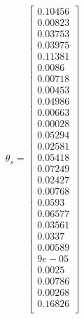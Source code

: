 \documentclass[a4paper]{article}
\theoremstyle{definition}
\newenvironment{soln}{
    \leavevmode\color{blue}\ignorespaces
}{}
\begin{document}
\begin{enumerate}
\begin{soln}
\begin{minipage}{0.5\textwidth}
\begin{gather*}
        \end{gather*}
    \end{minipage}
    \begin{minipage}{0.5\textwidth}
        \begin{gather*}
            \theta_{s}=\begin{bmatrix}
                            0.10456 \\
                            0.00823 \\
                            0.03753 \\
                            0.03975 \\
                            0.11381 \\
                            0.0086 \\
                            0.00718 \\
                            0.00453 \\
                            0.04986 \\
                            0.00663 \\
                            0.00028 \\
                            0.05294 \\
                            0.02581 \\
                            0.05418 \\
                            0.07249 \\
                            0.02427 \\
                            0.00768 \\
                            0.0593 \\
                            0.06577 \\
                            0.03561 \\
                            0.0337 \\
                            0.00589 \\
                            9e-05 \\
                            0.0025 \\
                            0.00786 \\
                            0.00268 \\
                            0.16826 \\
            \end{bmatrix}
        \end{gather*}
    \end{minipage}
\end{soln}



\end{enumerate}
\end{document}
